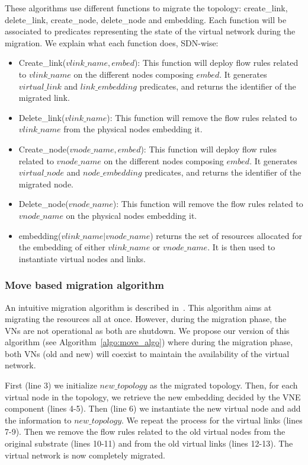 These algorithms use different functions to migrate the topology: create\_link, delete\_link, create\_node, delete\_node and embedding. 
Each function will be associated to predicates representing the state of the virtual network during the migration.
We explain what each function does, SDN-wise:

\begin{itemize}
\item Create\_link($vlink\_name,embed$): This function will deploy flow rules related to $vlink\_name$ on the different nodes composing $embed$. It generates $virtual\_link$ and $link\_embedding$ predicates, and returns the identifier of the migrated link.
\item Delete\_link($vlink\_name$): This function will remove the flow rules related to $vlink\_name$ from the physical nodes embedding it.
\item Create\_node($vnode\_name,embed$): This function will deploy flow rules related to $vnode\_name$ on the different nodes composing $embed$. It generates $virtual\_node$ and $node\_embedding$ predicates, and returns the identifier of the migrated node.
\item Delete\_node($vnode\_name$): This function will remove the flow rules related to  $vnode\_name$ on the physical nodes embedding it.
\item embedding($vlink\_name \vert vnode\_name$) returns the set of resources allocated for the embedding of either $vlink\_name$ or $vnode\_name$. It is then used to instantiate virtual nodes and links.
\end{itemize}



\subsubsection{Move based migration algorithm}
\label{sec:move-algo}

An intuitive migration algorithm is described in~\cite{Lime-Ghorbani2014}. 
This algorithm aims at migrating the resources all at once.
However, during the migration phase, the VNs are not operational as both are shutdown.
We propose our version of this algorithm (see Algorithm~\ref{algo:move_algo}) where during the migration phase, both VNs (old and new) will coexist to maintain the availability of the virtual network.

First (line 3) we initialize $new\_topology$ as the migrated topology. Then, for each virtual node in the topology, we retrieve the new embedding decided by the VNE component (lines 4-5).
Then (line 6) we instantiate the new virtual node and add the information to $new\_topology$.
We repeat the process for the virtual links (lines 7-9).
Then we remove the flow rules related to the old virtual nodes from the original substrate (lines 10-11) and from the old virtual links (lines 12-13).
The virtual network is now completely migrated.

